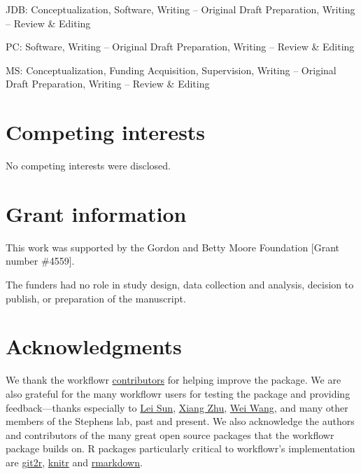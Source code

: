 \documentclass[9pt,a4paper]{extarticle}
\begin{document}
JDB: Conceptualization, Software, Writing – Original Draft Preparation,
Writing – Review \& Editing

PC: Software, Writing – Original Draft Preparation, Writing – Review \&
Editing

MS: Conceptualization, Funding Acquisition, Supervision, Writing –
Original Draft Preparation, Writing – Review \& Editing


\section*{Competing interests}

No competing interests were disclosed.


\section*{Grant information}

This work was supported by the Gordon and Betty Moore Foundation [Grant
number \#4559].

The funders had no role in study design, data collection and analysis,
decision to publish, or preparation of the manuscript.


\section*{Acknowledgments}

We thank the workflowr
\href{https://github.com/jdblischak/workflowr/graphs/contributors}{contributors}
for helping improve the package. We are also grateful for the many
workflowr users for testing the package and providing feedback---thanks
especially to \href{https://github.com/LSun}{Lei Sun},
\href{https://github.com/xiangzhu}{Xiang Zhu},
\href{https://github.com/NKweiwang}{Wei Wang}, and many other members of
the Stephens lab, past and present. We also acknowledge the authors and
contributors of the many great open source packages that the workflowr
package builds on. R packages particularly critical to workflowr's
implementation are
\href{https://cran.r-project.org/web/packages/git2r/index.html}{git2r},
\href{https://github.com/yihui/knitr}{knitr} and
\href{http://rmarkdown.rstudio.com/}{rmarkdown}.

{\small

}
\end{document}
